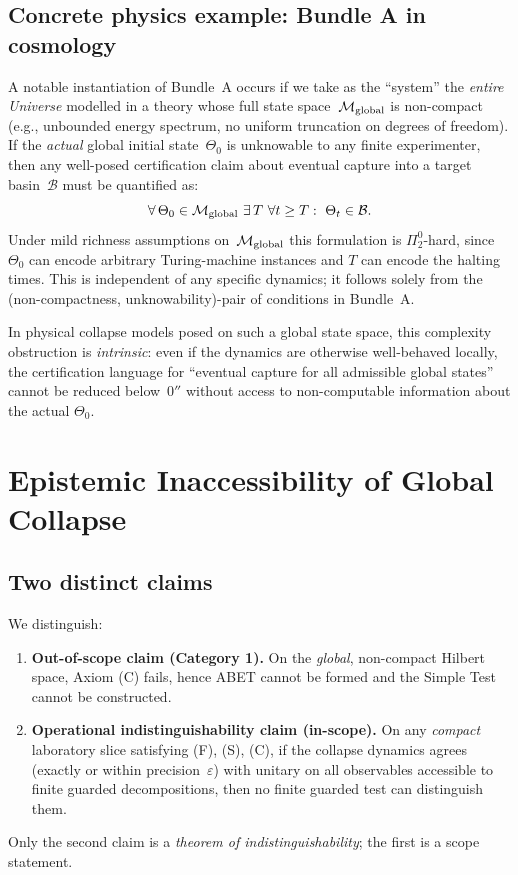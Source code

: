 \documentclass[12pt]{article}
\theoremstyle{definition}
\theoremstyle{plain}
\begin{document}
\subsection{Concrete physics example: Bundle A in cosmology}

A notable instantiation of Bundle~A occurs 
if we take as the ``system'' the \emph{entire Universe} 
modelled in a theory whose full state space~\(\mathcal{M}_{\rm global}\) 
is non-compact (e.g., unbounded energy spectrum, 
no uniform truncation on degrees of freedom). 
If the \emph{actual} global initial state~\(\Theta_0\) 
is unknowable to any finite experimenter, 
then any well-posed certification claim 
about eventual capture into a target basin~\(\mathcal{B}\) 
must be quantified as:
\[
\forall\, \Theta_0\in\mathcal{M}_{\rm global}\ \exists\, T\ \forall t\ge T:\ 
\Theta_t\in\mathcal{B}.
\]
Under mild richness assumptions on~\(\mathcal{M}_{\rm global}\) 
this formulation is \(\Pi^0_2\)-hard, 
since \(\Theta_0\) can encode arbitrary Turing-machine instances 
and \(T\) can encode the halting times. 
This is independent of any specific dynamics; 
it follows solely from the 
(non-compactness, unknowability)-pair of conditions in Bundle~A.

In physical collapse models posed on such a global state space, 
this complexity obstruction is \emph{intrinsic}: 
even if the dynamics are otherwise well-behaved locally, 
the certification language for ``eventual capture for all admissible global states'' 
cannot be reduced below~\(0''\) without access to non-computable information 
about the actual \(\Theta_0\).


\section{Epistemic Inaccessibility of Global Collapse}
\label{sec:global-collapse-inaccessibility}

\subsection{Two distinct claims}
We distinguish:
\begin{enumerate}[leftmargin=1.5em,itemsep=2pt]
  \item \textbf{Out-of-scope claim (Category 1).} On the \emph{global}, non-compact Hilbert space, Axiom (C) fails, hence ABET cannot be formed and the Simple Test cannot be constructed.
  \item \textbf{Operational indistinguishability claim (in-scope).} On any \emph{compact} laboratory slice satisfying (F), (S), (C), if the collapse dynamics agrees (exactly or within precision~$\varepsilon$) with unitary on all observables accessible to finite guarded decompositions, then no finite guarded test can distinguish them.
\end{enumerate}
Only the second claim is a \emph{theorem of indistinguishability}; the first is a scope statement.
\end{document}
